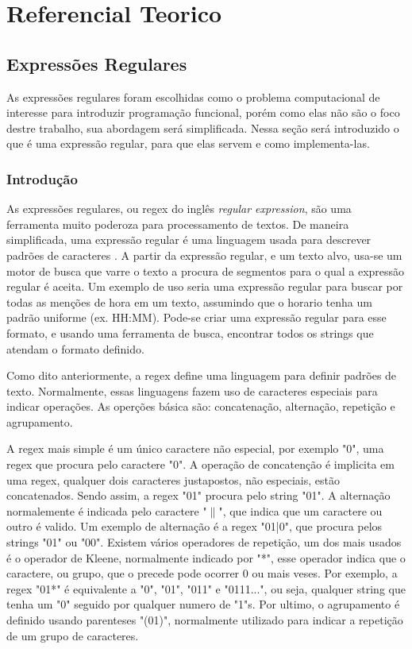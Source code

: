 \section{Referencial Teorico}

\subsection{Expressões Regulares}
As expressões regulares foram escolhidas como o problema computacional de interesse para introduzir programação funcional, porém como elas não são o foco destre trabalho, sua abordagem será simplificada.
Nessa seção será introduzido o que é uma expressão regular, para que elas servem e como implementa-las.

\subsubsection{Introdução}
As expressões regulares, ou regex do inglês \emph{regular expression}, são uma ferramenta muito poderoza para processamento de textos.
De maneira simplificada, uma expressão regular é uma linguagem usada para descrever padrões de caracteres \cite{mastering}.
A partir da expressão regular, e um texto alvo, usa-se um motor de busca que varre o texto a procura de segmentos para o qual a expressão regular é aceita.
Um exemplo de uso seria uma expressão regular para buscar por todas as menções de hora em um texto, assumindo que o horario tenha um padrão uniforme (ex. HH:MM).
Pode-se criar uma expressão regular para esse formato, e usando uma ferramenta de busca, encontrar todos os strings que atendam o formato definido.

Como dito anteriormente, a regex define uma linguagem para definir padrões de texto.
Normalmente, essas linguagens fazem uso de caracteres especiais para indicar operações.
As operções básica são: concatenação, alternação, repetição e agrupamento.

A regex mais simple é um único caractere não especial, por exemplo "0", uma regex que procura pelo caractere "0".
A operação de concatenção é implicita em uma regex, qualquer dois caracteres justapostos, não especiais, estão concatenados.
Sendo assim, a regex "01" procura pelo string "01".
A alternação normalemente é indicada pelo caractere "$\|$", que indica que um caractere ou outro é valido.
Um exemplo de alternação é a regex "01|0", que procura pelos strings "01" ou "00".
Existem vários operadores de repetição, um dos mais usados é o operador de Kleene, normalmente indicado por "*", esse operador indica que o caractere, ou grupo, que o precede pode ocorrer 0 ou mais veses.
Por exemplo, a regex "01*" é equivalente a "0", "01", "011" e "0111...", ou seja, qualquer string que tenha um "0" seguido por qualquer numero de "1"s.
Por ultimo, o agrupamento é definido usando parenteses "(01)", normalmente utilizado para indicar a repetição de um grupo de caracteres\cite{mastering}.

